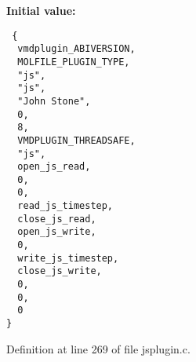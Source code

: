 {\bf Initial value:}

\footnotesize\begin{verbatim} {
  vmdplugin_ABIVERSION,                         
  MOLFILE_PLUGIN_TYPE,                          
  "js",                                         
  "js",                                         
  "John Stone",                                 
  0,                                            
  8,                                            
  VMDPLUGIN_THREADSAFE,                         
  "js",                                         
  open_js_read,
  0,
  0,
  read_js_timestep,
  close_js_read,
  open_js_write,
  0,
  write_js_timestep,
  close_js_write,
  0,                            
  0,                            
  0                             
}\end{verbatim}\normalsize 


Definition at line 269 of file jsplugin.c.